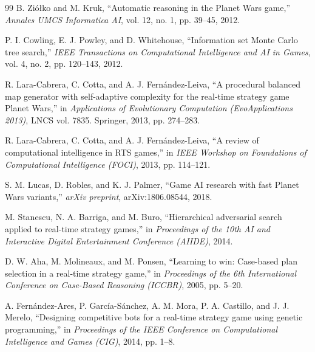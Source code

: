 \documentclass[conference]{IEEEtran}
\begin{document}
\begin{thebibliography}{99}
 B. Ziółko and M. Kruk, ``Automatic reasoning in the Planet Wars game,'' \textit{Annales UMCS Informatica AI}, vol. 12, no. 1, pp. 39--45, 2012.

 P. I. Cowling, E. J. Powley, and D. Whitehouse, ``Information set Monte Carlo tree search,'' \textit{IEEE Transactions on Computational Intelligence and AI in Games}, vol. 4, no. 2, pp. 120--143, 2012.

 R. Lara-Cabrera, C. Cotta, and A. J. Fernández-Leiva, ``A procedural balanced map generator with self-adaptive complexity for the real-time strategy game Planet Wars,'' in \textit{Applications of Evolutionary Computation (EvoApplications 2013)}, LNCS vol. 7835. Springer, 2013, pp. 274--283.

 R. Lara-Cabrera, C. Cotta, and A. J. Fernández-Leiva, ``A review of computational intelligence in RTS games,'' in \textit{IEEE Workshop on Foundations of Computational Intelligence (FOCI)}, 2013, pp. 114--121.

 S. M. Lucas, D. Robles, and K. J. Palmer, ``Game AI research with fast Planet Wars variants,'' \textit{arXiv preprint}, arXiv:1806.08544, 2018.

 M. Stanescu, N. A. Barriga, and M. Buro, ``Hierarchical adversarial search applied to real-time strategy games,'' in \textit{Proceedings of the 10th AI and Interactive Digital Entertainment Conference (AIIDE)}, 2014.



 D. W. Aha, M. Molineaux, and M. Ponsen, ``Learning to win: Case-based plan selection in a real-time strategy game,'' in \textit{Proceedings of the 6th International Conference on Case-Based Reasoning (ICCBR)}, 2005, pp. 5--20.

 A. Fernández-Ares, P. García-Sánchez, A. M. Mora, P. A. Castillo, and J. J. Merelo, ``Designing competitive bots for a real-time strategy game using genetic programming,'' in \textit{Proceedings of the IEEE Conference on Computational Intelligence and Games (CIG)}, 2014, pp. 1--8.
\end{thebibliography}
\end{document}
